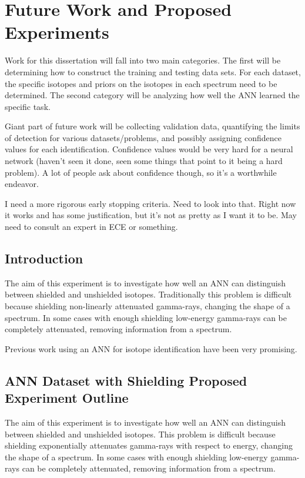 \documentclass[thesis,tocnosub,noragright,centerchapter,12pt,fullpage]{uiucecethesis09}
\begin{document}
\chapter{Future Work and Proposed Experiments}

Work for this dissertation will fall into two main categories. The first will be determining how to construct the training and testing data sets. For each dataset, the specific isotopes and priors on the isotopes in each spectrum need to be determined.  The second category will be analyzing how well the ANN learned the specific task. 

Giant part of future work will be collecting validation data, quantifying the limits of detection for various datasets/problems, and possibly assigning confidence values for each identification. Confidence values would be very hard for a neural network (haven't seen it done, seen some things that point to it being a hard problem). A lot of people ask about confidence though, so it's a worthwhile endeavor.  

I need a more rigorous early stopping criteria. Need to look into that. Right now it works and has some justification, but it's not as pretty as I want it to be. May need to consult an expert in ECE or something.


\section{Introduction}

The aim of this experiment is to investigate how well an ANN can distinguish between shielded and unshielded isotopes. Traditionally this problem is difficult because shielding non-linearly attenuated gamma-rays, changing the shape of a spectrum. In some cases with enough shielding low-energy gamma-rays can be completely attenuated, removing information from a spectrum. 

Previous work using an ANN for isotope identification have been very promising.


\section{ANN Dataset with Shielding Proposed Experiment Outline}

The aim of this experiment is to investigate how well an ANN can distinguish between shielded and unshielded isotopes. This problem is difficult because shielding exponentially attenuates gamma-rays with respect to energy, changing the shape of a spectrum. In some cases with enough shielding low-energy gamma-rays can be completely attenuated, removing information from a spectrum. 
\end{document}
